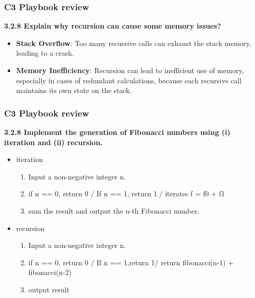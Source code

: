 \documentclass[
	11pt, %
]{beamer}
\begin{document}
\begin{frame}
	\frametitle{C3 Playbook review}
    \textbf{3.2.8 Explain why recursion can cause some memory issues?}
    \begin{itemize}
        \item \textbf{Stack Overflow}: Too many recursive calls can exhaust the stack memory, leading to a crash.
        \item \textbf{Memory Inefficiency}: Recursion can lead to inefficient use of memory, especially in cases of redundant calculations, because each recursive call maintains its own state on the stack.
    \end{itemize}
\end{frame}

\begin{frame}
	\frametitle{C3 Playbook review}
    \textbf{3.2.8 Implement the generation of Fibonacci numbers using (i) iteration and (ii) recursion.}
    \begin{itemize}
        \item iteration \\
        \begin{enumerate}
            \item Input a non-negative integer n.
            \item if n == 0, return 0 / If n == 1, return 1./ iterates f = f0 + f1
            \item sum the result and output the n-th Fibonacci number.
        \end{enumerate}
        \item recursion\\
        \begin{enumerate}
            \item Input a non-negative integer n.
            \item if n == 0, return 0 / If n == 1,return 1/ return fibonacci(n-1) + fibonacci(n-2)
            \item output result
        \end{enumerate}
    \end{itemize}
\end{frame}
\end{document}
